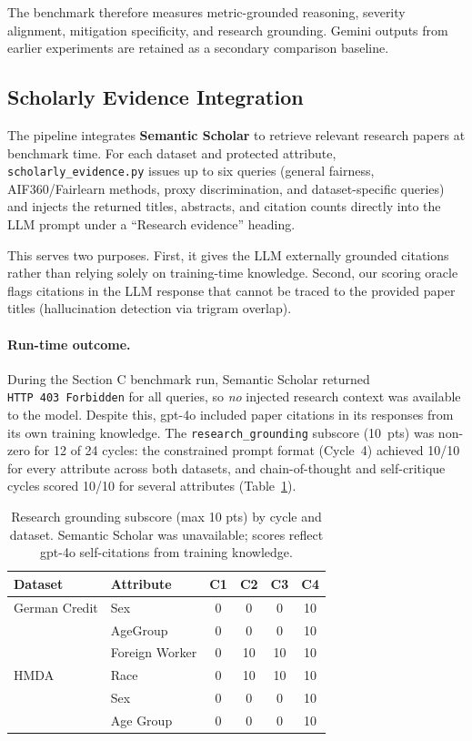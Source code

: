 \documentclass[11pt,a4paper]{article}
\begin{document}
The benchmark therefore measures metric-grounded reasoning, severity
alignment, mitigation specificity, and research grounding. Gemini outputs
from earlier experiments are retained as a secondary comparison baseline.

\subsection{Scholarly Evidence Integration}

The pipeline integrates \textbf{Semantic Scholar} to retrieve relevant
research papers at benchmark time. For each dataset and protected attribute,
\texttt{scholarly\_evidence.py} issues up to six queries (general fairness,
AIF360/Fairlearn methods, proxy discrimination, and dataset-specific
queries) and injects the returned titles, abstracts, and citation counts
directly into the LLM prompt under a ``Research evidence'' heading.

This serves two purposes. First, it gives the LLM externally grounded
citations rather than relying solely on training-time knowledge. Second,
our scoring oracle flags citations in the LLM response that cannot be
traced to the provided paper titles (hallucination detection via trigram
overlap).

\paragraph{Run-time outcome.}
During the Section C benchmark run, Semantic Scholar returned
\texttt{HTTP~403~Forbidden} for all queries, so \emph{no} injected
research context was available to the model. Despite this, gpt-4o
included paper citations in its responses from its own training
knowledge. The \texttt{research\_grounding} subscore (10~pts) was
non-zero for 12 of 24 cycles: the constrained prompt format (Cycle~4)
achieved 10/10 for every attribute across both datasets, and
chain-of-thought and self-critique cycles scored 10/10 for several
attributes (Table~\ref{tab:rg-scores}).

\begin{table}[H]
\centering
\caption{Research grounding subscore (max 10 pts) by cycle and dataset.
         Semantic Scholar was unavailable; scores reflect gpt-4o
         self-citations from training knowledge.}
\label{tab:rg-scores}
\begin{tabular}{llcccc}
\toprule
\textbf{Dataset} & \textbf{Attribute} & \textbf{C1} & \textbf{C2} & \textbf{C3} & \textbf{C4} \\
\midrule
German Credit & Sex              & 0 & 0  & 0  & 10 \\
              & AgeGroup         & 0 & 0  & 0  & 10 \\
              & Foreign Worker   & 0 & 10 & 10 & 10 \\
\midrule
HMDA          & Race             & 0 & 10 & 10 & 10 \\
              & Sex              & 0 & 0  & 0  & 10 \\
              & Age Group        & 0 & 0  & 0  & 10 \\
\bottomrule
\end{tabular}
\end{table}
\end{document}
